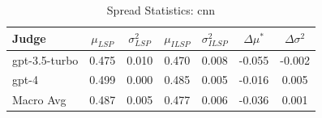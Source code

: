 \begin{table}[h]
\centering
\caption{Spread Statistics: cnn}
\label{tab:spread_cnn}
\begin{tabular}{l c c c c c c}
\hline
Judge & $\mu_{LSP}$ & $\sigma^2_{LSP}$ & $\mu_{ILSP}$ & $\sigma^2_{ILSP}$ & $\Delta\mu^*$ & $\Delta\sigma^2$ \\
\hline
gpt-3.5-turbo & 0.475 & 0.010 & 0.470 & 0.008 & -0.055 & -0.002 \\
gpt-4 & 0.499 & 0.000 & 0.485 & 0.005 & -0.016 & 0.005 \\
\hline
Macro Avg & 0.487 & 0.005 & 0.477 & 0.006 & -0.036 & 0.001 \\
\hline
\end{tabular}
\end{table}